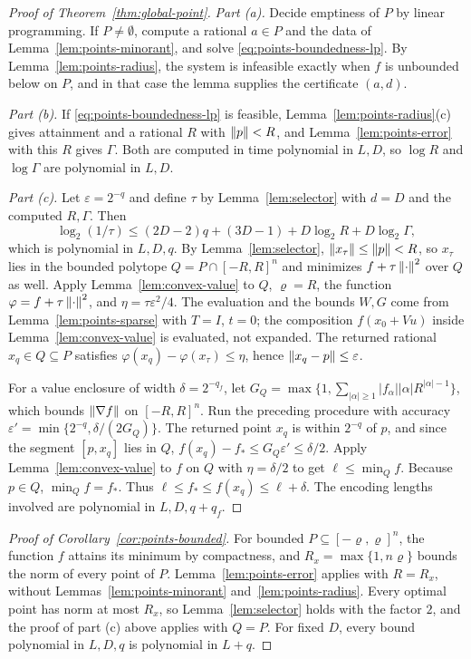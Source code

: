 \begin{proof}[Proof of Theorem~\ref{thm:global-point}]
\emph{Part (a).} Decide emptiness of $P$ by linear programming. If
$P\ne\emptyset$, compute a rational $a\in P$ and the data of
Lemma~\ref{lem:points-minorant}, and solve
\eqref{eq:points-boundedness-lp}. By Lemma~\ref{lem:points-radius}, the
system is infeasible exactly when $f$ is unbounded below on $P$, and in that
case the lemma supplies the certificate $(a,d)$.

\emph{Part (b).} If \eqref{eq:points-boundedness-lp} is feasible,
Lemma~\ref{lem:points-radius}(c) gives attainment and a rational $R$ with
$\left\lVert p\right\rVert<R$, and Lemma~\ref{lem:points-error} with this $R$ gives $\Gamma$.
Both are computed in time polynomial in $L,D$, so $\log R$ and $\log\Gamma$
are polynomial in $L,D$.

\emph{Part (c).} Let $\varepsilon=2^{-q}$ and define $\tau$ by
Lemma~\ref{lem:selector} with $d=D$ and the computed $R,\Gamma$. Then
\[
 \log_2(1/\tau)\le(2D-2)q+(3D-1)+D\log_2R+D\log_2\Gamma ,
\]
which is polynomial in $L,D,q$. By Lemma~\ref{lem:selector},
$\left\lVert x_\tau\right\rVert\le\left\lVert p\right\rVert<R$, so $x_\tau$ lies in the bounded polytope
$Q=P\cap[-R,R]^n$ and minimizes $f+\tau\left\lVert\cdot\right\rVert^2$ over $Q$ as well.
Apply Lemma~\ref{lem:convex-value} to $Q$, $\varrho=R$, the function
$\varphi=f+\tau\left\lVert\cdot\right\rVert^2$, and $\eta=\tau\varepsilon^2/4$. The
evaluation and the bounds $W,G$ come from Lemma~\ref{lem:points-sparse} with
$T=I$, $t=0$; the composition $f(x_0+Vu)$ inside
Lemma~\ref{lem:convex-value} is evaluated, not expanded. The returned
rational $x_q\in Q\subseteq P$ satisfies
$\varphi(x_q)-\varphi(x_\tau)\le\eta$, hence $\left\lVert x_q-p\right\rVert\le\varepsilon$.

For a value enclosure of width $\delta=2^{-q_f}$, let
$G_Q=\max\{1,\sum_{|\alpha|\ge1}|f_\alpha||\alpha|R^{|\alpha|-1}\}$, which
bounds $\left\lVert\nabla f\right\rVert$ on $[-R,R]^n$. Run the preceding procedure with
accuracy $\varepsilon'=\min\{2^{-q},\delta/(2G_Q)\}$. The returned point
$x_q$ is within $2^{-q}$ of $p$, and since the segment $[p,x_q]$ lies in $Q$,
$f(x_q)-f_*\le G_Q\varepsilon'\le\delta/2$. Apply
Lemma~\ref{lem:convex-value} to $f$ on $Q$ with $\eta=\delta/2$ to get
$\ell\le\min_Qf$. Because $p\in Q$, $\min_Qf=f_*$. Thus
$\ell\le f_*\le f(x_q)\le\ell+\delta$. The encoding lengths involved are
polynomial in $L,D,q+q_f$.
\end{proof}

\begin{proof}[Proof of Corollary~\ref{cor:points-bounded}]
For bounded $P\subseteq[-\varrho,\varrho]^n$, the function $f$ attains its
minimum by compactness, and $R_x=\max\{1,n\varrho\}$ bounds the norm of every
point of $P$. Lemma~\ref{lem:points-error} applies with $R=R_x$, without
Lemmas~\ref{lem:points-minorant} and~\ref{lem:points-radius}. Every optimal
point has norm at most $R_x$, so Lemma~\ref{lem:selector} holds with the
factor $2$, and the proof of part (c) above applies with $Q=P$. For fixed
$D$, every bound polynomial in $L,D,q$ is polynomial in $L+q$.
\end{proof}

